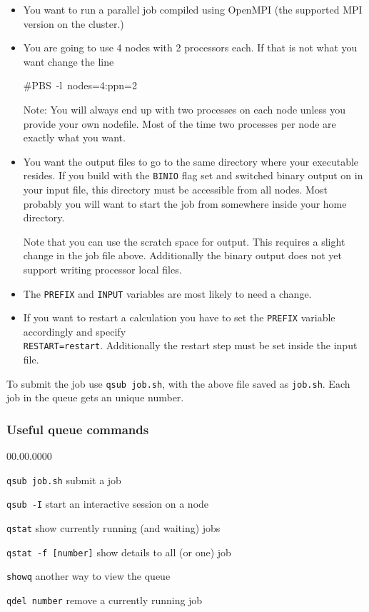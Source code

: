 \begin{itemize}
\item You want to run a parallel job compiled using OpenMPI (the supported
MPI version on the cluster.)
\item You are going to use 4 nodes with 2 processors each. If that is not
what you want change the line

\begin{lyxcode}
\#PBS~-l~nodes=4:ppn=2
\end{lyxcode}
Note: You will always end up with two processes on each node unless
you provide your own nodefile. Most of the time two processes per
node are exactly what you want.

\item You want the output files to go to the same directory where your \ccarat{}
executable resides. If you build \ccarat{} with the \texttt{BINIO}
flag set and switched binary output on in your input file, this directory
must be accessible from all nodes. Most probably you will want to
start the job from somewhere inside your home directory.


Note that you can use the scratch space for output. This requires
a slight change in the job file above. Additionally the binary output
does not yet support writing processor local files.

\item The \texttt{PREFIX} and \texttt{INPUT} variables are most likely to
need a change.
\item If you want to restart a calculation you have to set the \texttt{PREFIX}
variable accordingly and specify \\
\texttt{RESTART=restart}. Additionally
the restart step must be set inside the input file.
\end{itemize}
To submit the job use \texttt{qsub job.sh}, with the above file saved
as \texttt{job.sh}. Each job in the queue gets an unique number.


\subsubsection{Useful queue commands}

\begin{lyxlist}{00.00.0000}
\item [{\texttt{qsub~job.sh}}] submit a job
\item [{\texttt{qsub~-I}}] start an interactive session on a node
\item [{\texttt{qstat}}] show currently running (and waiting) jobs
\item [{\texttt{qstat~-f~{[}number]}}] show details to all (or one) job
\item [{\texttt{showq}}] another way to view the queue
\item [{\texttt{qdel~number}}] remove a currently running job
\end{lyxlist}

